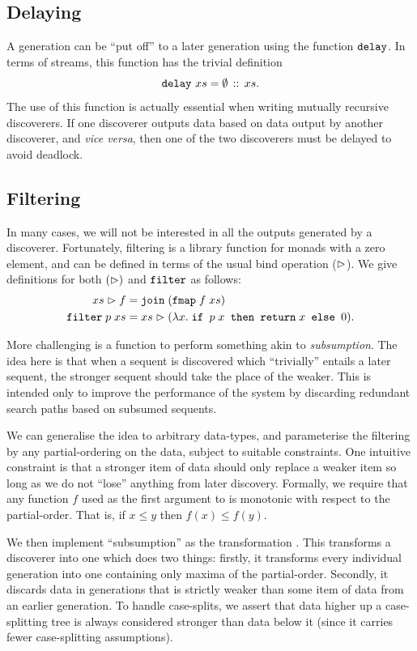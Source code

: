 \subsection{Delaying}
A generation can be ``put off'' to a later generation using the function $\texttt{delay}$. In terms of streams, this function has the trivial definition
\begin{displaymath}
  \texttt{delay}\ xs = \emptyset\,::\,xs.
\end{displaymath}
The use of this function is actually essential when writing mutually recursive discoverers. If one discoverer outputs data based on data output by another discoverer, and \emph{vice versa}, then one of the two discoverers must be delayed to avoid deadlock.

\subsection{Filtering}\label{sec:Filtering}
In many cases, we will not be interested in all the outputs generated by a discoverer. Fortunately, filtering is a library function for monads with a zero element, and can be defined in terms of the usual bind operation ($\vartriangleright$). We give definitions for both $(\vartriangleright)$ and $\texttt{filter}$ as follows:
\begin{align*}
xs \vartriangleright f &= \texttt{join}\;(\texttt{fmap}\;f\;xs) \\
\texttt{filter}\;p\;xs &= xs \vartriangleright (\lambda x.\;\texttt{if } p\;x \texttt{ then } \texttt{return}\;x \texttt { else } 0).
\end{align*}

More challenging is a function to perform something akin to \emph{subsumption}. The idea here is that when a sequent is discovered which ``trivially'' entails a later sequent, the stronger sequent should take the place of the weaker. This is intended only to improve the performance of the system by discarding redundant search paths based on subsumed sequents. 

We can generalise the idea to arbitrary data-types, and parameterise the filtering by any partial-ordering on the data, subject to suitable constraints. One intuitive constraint is that a stronger item of data should only replace a weaker item so long as we do not ``lose'' anything from later discovery. Formally, we require that any function $f$ used as the first argument to  is monotonic with respect to the partial-order. That is, if $x \leq y$ then $f(x) \leq f(y)$. 

We then implement ``subsumption'' as the transformation . This transforms a discoverer into one which does two things: firstly, it transforms every individual generation into one containing only maxima of the partial-order. Secondly, it discards data in generations that is strictly weaker than some item of data from an earlier generation. To handle case-splits, we assert that data higher up a case-splitting tree is always considered stronger than data below it (since it carries fewer case-splitting assumptions).

